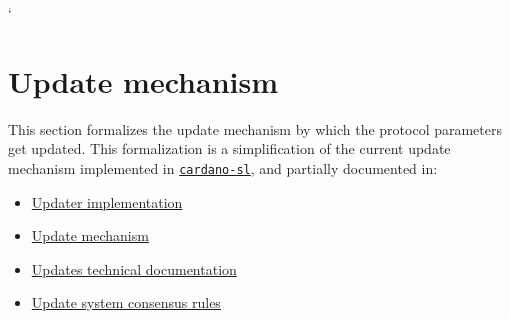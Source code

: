 \newcommand{\UProp}{\ensuremath{\type{UProp}}}
\newcommand{\UPropId}{\ensuremath{\type{UPropId}}}
\newcommand{\UPropSD}{\ensuremath{\type{UPropSD}}}
\newcommand{\ProtVer}{\ensuremath{\type{ProtVer}}}
\newcommand{\ProtPm}{\ensuremath{\type{Ppm}}}
\newcommand{\PPMMap}{\ensuremath{\type{PpmMap}}}
\newcommand{\Rups}{\ensuremath{\type{Rups}}}
\newcommand{\UPVEnv}{\ensuremath{\type{UPVEnv}}}
\newcommand{\UPVState}{\ensuremath{\type{UPVState}}}
\newcommand{\UPLEnv}{\ensuremath{\type{UPLEnv}}}
\newcommand{\UPLState}{\ensuremath{\type{UPLState}}}
\newcommand{\UPAEnv}{\ensuremath{\type{UPAEnv}}}
\newcommand{\UPRState}{\ensuremath{\type{UPRState}}}
\newcommand{\Vote}{\ensuremath{\type{Vote}}}
\newcommand{\VEnv}{\ensuremath{\type{VEnv}}}
\newcommand{\VState}{\ensuremath{\type{VState}}}
\newcommand{\BVREnv}{\ensuremath{\type{BVREnv}}}
\newcommand{\BVRState}{\ensuremath{\type{BVRState}}}
\newcommand{\BkNr}{\ensuremath{\type{BkNr}}}

\newcommand{\upSize}[1]{\ensuremath{\fun{upSize}~\var{#1}}}
\newcommand{\upPV}[1]{\ensuremath{\fun{upPV}~\var{#1}}}
\newcommand{\upId}[1]{\ensuremath{\fun{upId}~\var{#1}}}
\newcommand{\upSig}[1]{\ensuremath{\fun{upSig}~\var{#1}}}
\newcommand{\upSigData}[1]{\ensuremath{\fun{upSigData}~\var{#1}}}
\newcommand{\upIssuer}[1]{\ensuremath{\fun{upIssuer}~\var{#1}}}
\newcommand{\upParams}[1]{\ensuremath{\fun{upParams}~\var{#1}}}
\newcommand{\vCaster}[1]{\ensuremath{\fun{vCaster}~\var{#1}}}
\newcommand{\vPropId}[1]{\ensuremath{\fun{vPropId}~\var{#1}}}
\newcommand{\vSig}[1]{\ensuremath{\fun{vSig}~\var{#1}}}


\lstMakeShortInline[columns=fixed]`

\section{Update mechanism}
\label{sec:update}

This section formalizes the update mechanism by which the protocol parameters
get updated. This formalization is a simplification of the current update
mechanism implemented in
\href{https://github.com/input-output-hk/cardano-sl/}{\texttt{cardano-sl}}, and
partially documented in:
\begin{itemize}
\item \href{https://cardanodocs.com/technical/updater/}{Updater implementation}
\item \href{https://cardanodocs.com/cardano/update-mechanism/}{Update mechanism}
\item \href{https://github.com/input-output-hk/cardano-sl/blob/develop/wallet-new/docs/updates.md}{Updates technical documentation}
\item
  \href{https://github.com/input-output-hk/cardano-sl/blob/develop/docs/block-processing/us.md}{Update
    system consensus rules}
\end{itemize}

